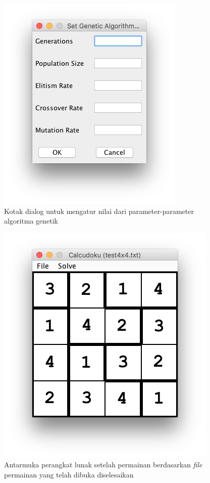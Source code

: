\begin{figure}
\centering
\captionsetup{justification=centering}
\includegraphics[scale=0.5]{Gambar/ImplementasiPengujian/SetGAParameters.png}
\caption[Kotak dialog untuk mengatur nilai dari parameter-parameter algoritma genetik]{Kotak dialog untuk mengatur nilai dari parameter-parameter algoritma genetik}
\label{fig:antarmukapl4}
\end{figure}

\begin{figure}
\centering
\captionsetup{justification=centering}
\includegraphics[scale=0.5]{Gambar/ImplementasiPengujian/Calcudoku3.png}
\caption[Antarmuka perangkat lunak setelah permainan berdasarkan \textit{file} permainan yang telah dibuka diselesaikan]{Antarmuka perangkat lunak setelah permainan berdasarkan \textit{file} permainan yang telah dibuka diselesaikan}
\label{fig:antarmukapl5}
\end{figure}

